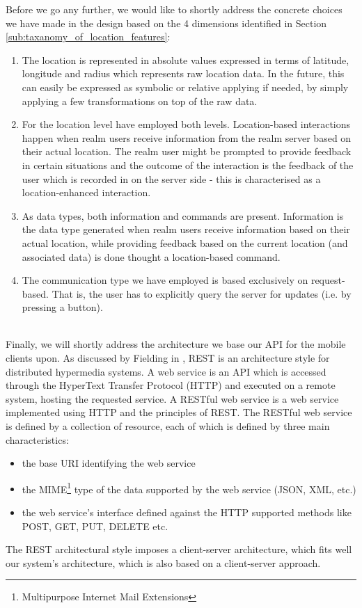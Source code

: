 \noindent Before we go any further, we would like to shortly address the concrete choices we have made in the design based on the 4 dimensions identified in Section \ref{sub:taxanomy_of_location_features}:
\begin{enumerate}
	\item The location is represented in absolute values expressed in terms of latitude, longitude and radius which represents raw location data. In the future, this can easily be expressed as symbolic or relative applying if needed, by simply applying a few transformations on top of the raw data.
	\item For the location level have employed both levels. Location-based interactions happen when realm users receive information from the realm server based on their actual location. The realm user might be prompted to provide feedback in certain situations and the outcome of the interaction is the feedback of the user which is recorded in on the server side - this is characterised as a location-enhanced interaction.
	\item As data types, both information and commands are present. Information is the data type generated when realm users receive information based on their actual location, while providing feedback based on the current location (and associated data) is done thought a location-based command.
	\item The communication type we have employed is based exclusively on request-based. That is, the user has to explicitly query the server for updates (i.e. by pressing a button).
\end{enumerate}
\\

\noindent Finally, we will shortly address the architecture we base our API for the mobile clients upon. As discussed by Fielding in \cite{Fielding:2000}, REST is an architecture style for distributed hypermedia systems. A web service is an API which is accessed through the HyperText Transfer Protocol (HTTP) and executed on a remote system, hosting the requested service. A RESTful web service is a web service implemented using HTTP and the principles of REST. The RESTful web service is defined by a collection of resource, each of which is defined by three main characteristics:
\begin{itemize}
  \item the base URI identifying the web service
  \item the MIME\footnote{Multipurpose Internet Mail Extensions} type of the
  data supported by the web service (JSON, XML, etc.)
  \item the web service's interface defined against the HTTP supported methods
  like POST, GET, PUT, DELETE etc.
\end{itemize}
The REST architectural style imposes a client-server architecture, which fits well our system's architecture, which is also based on a client-server approach.

